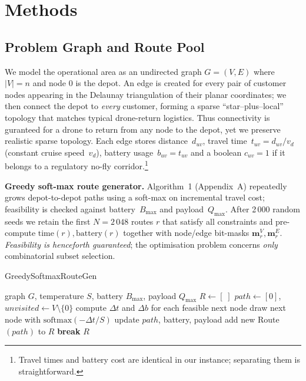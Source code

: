 \section{Methods}\label{sec:methods}

\subsection{Problem Graph and Route Pool}\label{sec:graph}

We model the operational area as an undirected graph
\(G=(V,E)\) where \(|V| = n\) and node \(0\) is the depot.
An edge is created for every pair of customer nodes appearing in the
Delaunay triangulation of their planar coordinates; we then connect the
depot to \emph{every} customer, forming a sparse ``star–plus–local''
topology that matches typical drone-return logistics.
Thus connectivity is guranteed for a drone to return from any node to the depot,
yet we preserve realistic sparse topology. 
Each edge stores distance~\(d_{uv}\), travel
time~\(t_{uv}=d_{uv}/v_{d}\) (constant cruise speed~\(v_{d}\)),
battery usage~\(b_{uv}=t_{uv}\) and a boolean
\(c_{uv}=1\) if it belongs to a regulatory no-fly corridor.\footnote{%
Travel times and battery cost are identical in our instance; separating
them is straightforward.}

\vspace{2pt}\noindent
\textbf{Greedy soft-max route generator.}
Algorithm~1 (Appendix~A) repeatedly grows depot-to-depot paths using a
soft-max on incremental travel cost; feasibility is checked against
battery~\(B_{\max}\) and payload~\(Q_{\max}\).
After 2\,000 random seeds we retain the first
\(N=2\,048\) routes \(r\) that satisfy all constraints and pre-compute
\(\text{time}(r), \text{battery}(r)\) together with
node/edge bit-masks \(\boldsymbol{m}^V_r,\boldsymbol{m}^{E}_r\).
\emph{Feasibility is henceforth guaranteed};
the optimisation problem concerns \emph{only} combinatorial subset
selection.

\begin{algorithm}[H]
    \caption{GreedySoftmaxRouteGen}
    \label{alg:softmax}
    \begin{algorithmic}[1]
    \Require graph $G$, temperature $S$, battery $B_{\max}$, payload $Q_{\max}$
    \State $R \gets [\;]$
       \State $path \gets [0]$, $\textit{unvisited}\gets V\setminus\{0\}$
           \State compute $\Delta t$ and $\Delta b$ for each feasible next node
           \State draw next node with $\text{softmax}(-\Delta t/S)$
           \State update $path$, battery, payload
       \EndWhile
        
            \State add new Route$(path)$ to $R$
       \EndIf
        \textbf{break}
    \EndFor
    \State \Return $R$
    \end{algorithmic}
\end{algorithm}
    

